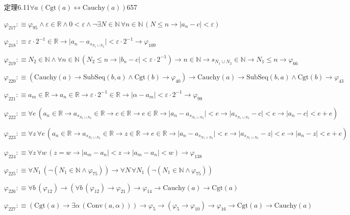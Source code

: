 \begin{fullproof}{定理6.11}{$\forall a\,(\mathrm{Cgt}(a) \leftrightarrow \mathrm{Cauchy}(a))$}{657}
\begin{abbrevlist}
\item $\varphi_{217} :\equiv \varphi_{95} \land \varepsilon \in \mathbb{R} \land 0 < \varepsilon \land \neg \exists N \in \mathbb{N}\,\forall n \in \mathbb{N}\,(N \leq n \to \lvert a_{n} - c \rvert < \varepsilon)$
\item $\varphi_{218} :\equiv \varepsilon \cdot 2^{-1} \in \mathbb{R} \to \lvert a_{n} - a_{s_{N_{1} \cup N_{2}}} \rvert < \varepsilon \cdot 2^{-1} \to \varphi_{109}$
\item $\varphi_{219} :\equiv N_{2} \in \mathbb{N} \land \forall n \in \mathbb{N}\,(N_{2} \leq n \to \lvert b_{n} - c \rvert < \varepsilon \cdot 2^{-1}) \to n \in \mathbb{N} \to s_{N_{1} \cup N_{2}} \in \mathbb{N} \to N_{1} \leq n \to \varphi_{66}$
\item $\varphi_{220} :\equiv (\mathrm{Cauchy}(a) \to \mathrm{SubSeq}(b,a) \land \mathrm{Cgt}(b) \to \varphi_{40}) \to \mathrm{Cauchy}(a) \to \mathrm{SubSeq}(b,a) \land \mathrm{Cgt}(b) \to \varphi_{43}$
\item $\varphi_{221} :\equiv a_{m} \in \mathbb{R} \to a_{n} \in \mathbb{R} \to \varepsilon \cdot 2^{-1} \in \mathbb{R} \to \lvert \alpha - a_{m} \rvert < \varepsilon \cdot 2^{-1} \to \varphi_{98}$
\item $\varphi_{222} :\equiv \forall e\,(a_{n} \in \mathbb{R} \to a_{s_{N_{1} \cup N_{2}}} \in \mathbb{R} \to c \in \mathbb{R} \to e \in \mathbb{R} \to \lvert a_{n} - a_{s_{N_{1} \cup N_{2}}} \rvert < e \to \lvert a_{s_{N_{1} \cup N_{2}}} - c \rvert < e \to \lvert a_{n} - c \rvert < e + e)$
\item $\varphi_{223} :\equiv \forall z\,\forall e\,(a_{n} \in \mathbb{R} \to a_{s_{N_{1} \cup N_{2}}} \in \mathbb{R} \to z \in \mathbb{R} \to e \in \mathbb{R} \to \lvert a_{n} - a_{s_{N_{1} \cup N_{2}}} \rvert < e \to \lvert a_{s_{N_{1} \cup N_{2}}} - z \rvert < e \to \lvert a_{n} - z \rvert < e + e)$
\item $\varphi_{224} :\equiv \forall z\,\forall w\,(z = w \to \lvert a_{m} - a_{n} \rvert < z \to \lvert a_{m} - a_{n} \rvert < w) \to \varphi_{138}$
\item $\varphi_{225} :\equiv \forall N_{1}\,(\neg (N_{1} \in \mathbb{N} \land \varphi_{75})) \to \forall N\,\forall N_{1}\,(\neg (N_{1} \in \mathbb{N} \land \varphi_{75}))$
\item $\varphi_{226} :\equiv \forall b\,(\varphi_{12}) \to (\forall b\,(\varphi_{12}) \to \varphi_{21}) \to \varphi_{14} \to \mathrm{Cauchy}(a) \to \mathrm{Cgt}(a)$
\item $\varphi_{227} :\equiv (\mathrm{Cgt}(a) \to \exists \alpha\,(\mathrm{Conv}(a,\alpha))) \to \varphi_{5} \to (\varphi_{5} \to \varphi_{10}) \to \varphi_{16} \to \mathrm{Cgt}(a) \to \mathrm{Cauchy}(a)$

\end{abbrevlist}
\end{fullproof}
